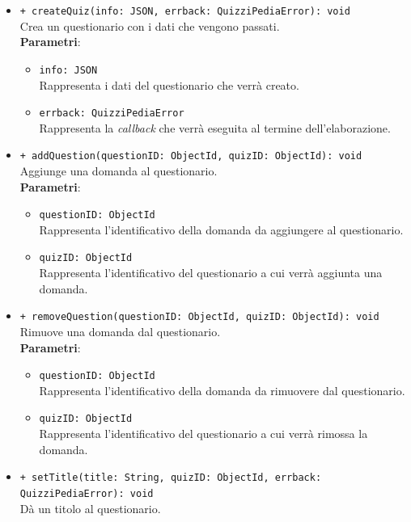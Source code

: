 \begin{itemize}
\begin{itemize}
			\item \texttt{+ createQuiz(info: JSON, errback: QuizziPediaError): void}\\
			Crea un questionario con i dati che vengono passati.\\
			\textbf{Parametri}:
			\begin{itemize}
				\item \texttt{info: JSON}\\
				Rappresenta i dati del questionario che verrà creato.
				\item \texttt{errback: QuizziPediaError}\\
				Rappresenta la \textit{callback} che verrà eseguita al termine dell'elaborazione.
			\end{itemize}
			\item \texttt{+ addQuestion(questionID: ObjectId, quizID: ObjectId): void}\\
			Aggiunge una domanda al questionario.\\
			\textbf{Parametri}:
			\begin{itemize}
				\item \texttt{questionID: ObjectId}\\
				Rappresenta l'identificativo della domanda da aggiungere al questionario.
				\item \texttt{quizID: ObjectId}\\
				Rappresenta l'identificativo del questionario a cui verrà aggiunta una domanda.
			\end{itemize}
			\item \texttt{+ removeQuestion(questionID: ObjectId, quizID: ObjectId): void}\\
			Rimuove una domanda dal questionario.\\
			\textbf{Parametri}:
			\begin{itemize}
				\item \texttt{questionID: ObjectId}\\
				Rappresenta l'identificativo della domanda da rimuovere dal questionario.
				\item \texttt{quizID: ObjectId}\\
				Rappresenta l'identificativo del questionario a cui verrà rimossa la domanda.
			\end{itemize}
			\item \texttt{+ setTitle(title: String, quizID: ObjectId,  errback: QuizziPediaError): void}\\ 						
			Dà un titolo al questionario.\\

\end{itemize}
\end{itemize}
